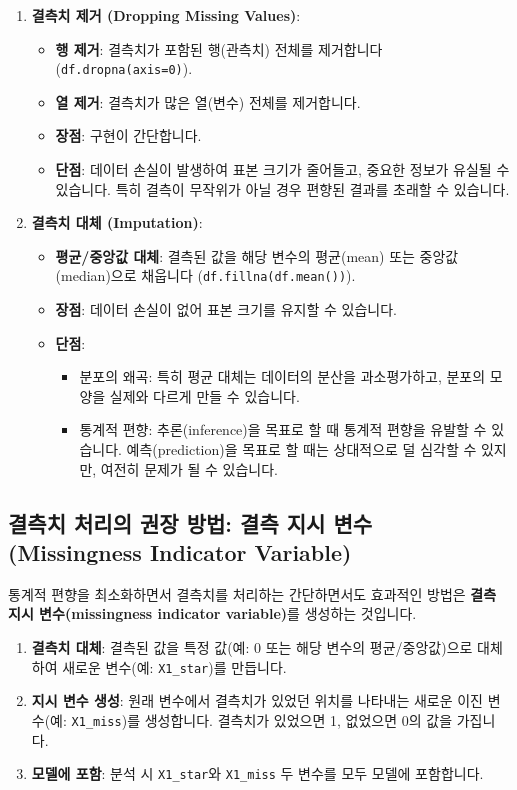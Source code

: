 \documentclass[11pt,a4paper]{article}
\theoremstyle{definition}
\begin{document}
\begin{enumerate}
    \item \textbf{결측치 제거 (Dropping Missing Values)}:
    \begin{itemize}
        \item \textbf{행 제거}: 결측치가 포함된 행(관측치) 전체를 제거합니다 (\texttt{df.dropna(axis=0)}).
        \item \textbf{열 제거}: 결측치가 많은 열(변수) 전체를 제거합니다.
        \item \textbf{장점}: 구현이 간단합니다.
        \item \textbf{단점}: 데이터 손실이 발생하여 표본 크기가 줄어들고, 중요한 정보가 유실될 수 있습니다. 특히 결측이 무작위가 아닐 경우 편향된 결과를 초래할 수 있습니다.
    \end{itemize}
    \item \textbf{결측치 대체 (Imputation)}:
    \begin{itemize}
        \item \textbf{평균/중앙값 대체}: 결측된 값을 해당 변수의 평균(mean) 또는 중앙값(median)으로 채웁니다 (\texttt{df.fillna(df.mean())}).
        \item \textbf{장점}: 데이터 손실이 없어 표본 크기를 유지할 수 있습니다.
        \item \textbf{단점}:
        \begin{itemize}
            \item 분포의 왜곡: 특히 평균 대체는 데이터의 분산을 과소평가하고, 분포의 모양을 실제와 다르게 만들 수 있습니다.
            \item 통계적 편향: 추론(inference)을 목표로 할 때 통계적 편향을 유발할 수 있습니다. 예측(prediction)을 목표로 할 때는 상대적으로 덜 심각할 수 있지만, 여전히 문제가 될 수 있습니다.
        \end{itemize}
    \end{itemize}
\end{enumerate}

\subsection*{결측치 처리의 권장 방법: 결측 지시 변수 (Missingness Indicator Variable)}
통계적 편향을 최소화하면서 결측치를 처리하는 간단하면서도 효과적인 방법은 \textbf{결측 지시 변수(missingness indicator variable)}를 생성하는 것입니다.

\begin{infobox}[title=결측 지시 변수 생성 절차]
\begin{enumerate}
    \item \textbf{결측치 대체}: 결측된 값을 특정 값(예: 0 또는 해당 변수의 평균/중앙값)으로 대체하여 새로운 변수(예: \texttt{X1_star})를 만듭니다.
    \item \textbf{지시 변수 생성}: 원래 변수에서 결측치가 있었던 위치를 나타내는 새로운 이진 변수(예: \texttt{X1_miss})를 생성합니다. 결측치가 있었으면 1, 없었으면 0의 값을 가집니다.
    \item \textbf{모델에 포함}: 분석 시 \texttt{X1_star}와 \texttt{X1_miss} 두 변수를 모두 모델에 포함합니다.
\end{enumerate}
\end{infobox}
\end{document}
